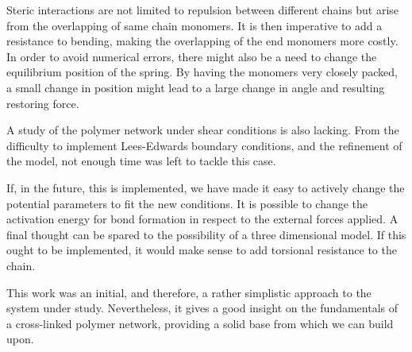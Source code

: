\documentclass[../../main.tex]{subfiles}
\begin{document}
    Steric interactions are not limited to repulsion between different chains but arise from the overlapping of same chain monomers. It is then imperative to add a resistance to bending, making the overlapping of the end monomers more costly. In order to avoid numerical errors, there might also be a need to change the equilibrium position of the spring. By having the monomers very closely packed, a small change in position might lead to a large change in angle and resulting restoring force.
    
    A study of the polymer network under shear conditions is also lacking. From the difficulty to implement Lees-Edwards boundary conditions, and the refinement of the model, not enough time was left to tackle this case. 
    
    If, in the future, this is implemented, we have made it easy to actively change the potential parameters to fit the new conditions. It is possible to change the activation energy for bond formation in respect to the external forces applied. A final thought can be spared to the possibility of a three dimensional model. If this ought to be implemented, it would make sense to add torsional resistance to the chain.
    
    This work was an initial, and therefore, a rather simplistic approach to the system under study. Nevertheless, it gives a good insight on the fundamentals of a cross-linked polymer network, providing a solid base from which we can build upon.
    
    
    
\end{document}
